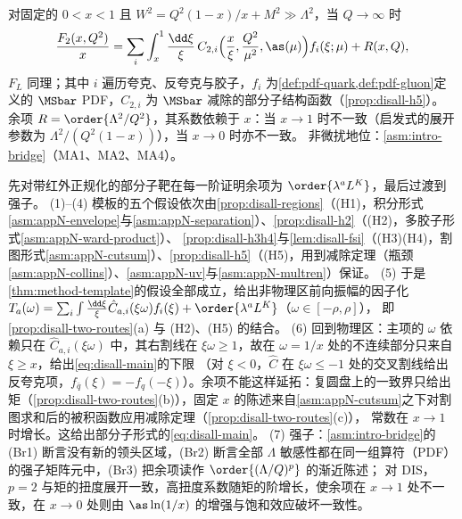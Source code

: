 \begin{theorem}\label{thm:disall-factorization}
对固定的 $0<x<1$ 且 $W^2=Q^2(1-x)/x+M^2\gg\Lambda^2$，当 $Q\to\infty$ 时
\begin{equation}\label{eq:disall-main}
\frac{F_2(x,Q^2)}{x}=\sum_i\int_x^1\frac{\dd\xi}{\xi}\,C_{2,i}\Big(\frac x\xi,\frac{Q^2}{\mu^2},\as(\mu)\Big)f_i(\xi;\mu)+R(x,Q),
\end{equation}
$F_L$ 同理；其中 $i$ 遍历夸克、反夸克与胶子，$f_i$ 为\cref{def:pdf-quark,def:pdf-gluon}定义的 $\MSbar$ PDF，$C_{2,i}$ 为 $\MSbar$ 减除的部分子结构函数（\cref{prop:disall-h5}）。
余项 $R=\order{\Lambda^2/Q^2}$，其系数依赖于 $x$：当 $x\to1$ 时不一致（启发式的展开参数为 $\Lambda^2/(Q^2(1-x))$），当 $x\to0$ 时亦不一致。
非微扰地位：\cref{asm:intro-bridge}（MA1、MA2、MA4）。
\end{theorem}

\begin{proofsketch}
先对带红外正规化的部分子靶在每一阶证明余项为 $\order{\lambda^aL^K}$，最后过渡到强子。
(1)--(4) 模板的五个假设依次由\cref{prop:disall-regions}（(H1)，积分形式\cref{asm:appN-envelope}与\cref{asm:appN-separation}）、\cref{prop:disall-h2}（(H2)，多胶子形式\cref{asm:appN-ward-product}）、
\cref{prop:disall-h3h4}与\cref{lem:disall-fsi}（(H3)(H4)，割图形式\cref{asm:appN-cutsum}）、\cref{prop:disall-h5}（(H5)，用到减除定理（瓶颈\cref{asm:appN-collins}）、\cref{asm:appN-uv}与\cref{asm:appN-multren}）保证。
(5) 于是\cref{thm:method-template}的假设全部成立，给出非物理区前向振幅的因子化 $T_a(\omega)=\sum_i\int\frac{\dd\xi}{\xi}\hat C_{a,i}(\xi\omega)f_i(\xi)+\order{\lambda^aL^K}$（$\omega\in[-\rho,\rho]$），
即\cref{prop:disall-two-routes}(a) 与 (H2)、(H5) 的结合。
(6) 回到物理区：主项的 $\omega$ 依赖只在 $\hat C_{a,i}(\xi\omega)$ 中，其右割线在 $\xi\omega\ge1$，故在 $\omega=1/x$ 处的不连续部分只来自 $\xi\ge x$，给出\cref{eq:disall-main}的下限
（对 $\xi<0$，$\hat C$ 在 $\xi\omega\le-1$ 处的交叉割线给出反夸克项，$f_{\bar q}(\xi)=-f_q(-\xi)$）。余项不能这样延拓：复圆盘上的一致界只给出矩（\cref{prop:disall-two-routes}(b)），固定 $x$ 的陈述来自\cref{asm:appN-cutsum}之下对割图求和后的被积函数应用减除定理（\cref{prop:disall-two-routes}(c)），
常数在 $x\to1$ 时增长。这给出部分子形式的\cref{eq:disall-main}。
(7) 强子：\cref{asm:intro-bridge}的 (Br1) 断言没有新的领头区域，(Br2) 断言全部 $\Lambda$ 敏感性都在同一组算符（PDF）的强子矩阵元中，(Br3) 把余项读作 $\order{(\Lambda/Q)^p}$ 的渐近陈述；
对 DIS，$p=2$ 与矩的扭度展开一致，高扭度系数随矩的阶增长，使余项在 $x\to1$ 处不一致，在 $x\to0$ 处则由 $\as\ln(1/x)$ 的增强与饱和效应破坏一致性。
\end{proofsketch}


